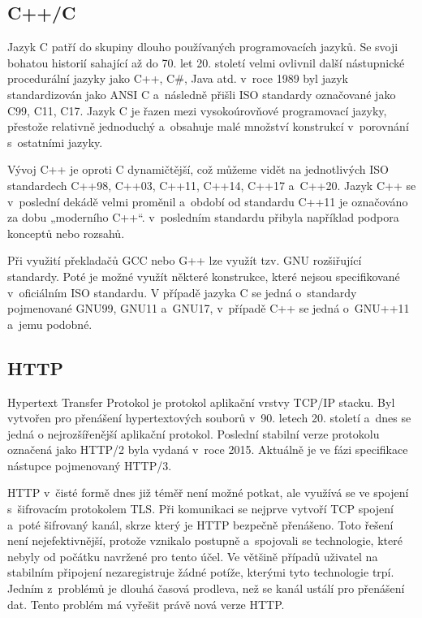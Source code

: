 \subsection{C++/C}

Jazyk C patří do skupiny dlouho používaných programovacích jazyků. Se svoji bohatou historií sahající až do 70. let 20. století velmi ovlivnil další nástupnické procedurální
jazyky jako C++, C\#, Java atd. v roce 1989 byl jazyk standardizován jako ANSI C a následně přišli ISO standardy označované jako C99, C11, C17. Jazyk C je řazen mezi
vysokoúrovňové programovací jazyky, přestože relativně jednoduchý a obsahuje malé množství konstrukcí v porovnání s ostatními jazyky.\cite{CReference}

Vývoj C++ je oproti C dynamičtější, což můžeme vidět na jednotlivých ISO standardech C++98, C++03, C++11, C++14, C++17 a C++20. Jazyk C++ se v poslední dekádě velmi
proměnil a období od standardu C++11 je označováno za dobu „moderního C++“. v posledním standardu přibyla například podpora konceptů nebo rozsahů.\cite{CPPReference}

Při využití překladačů GCC nebo G++ lze využít tzv. GNU rozšiřující standardy. Poté je možné využít některé konstrukce, které nejsou specifikované v oficiálním ISO standardu.
V případě jazyka C se jedná o standardy pojmenované GNU99, GNU11 a GNU17, v případě C++ se jedná o GNU++11 a jemu podobné.

\subsection{HTTP}

Hypertext Transfer Protokol je protokol aplikační vrstvy TCP/IP stacku. Byl vytvořen pro přenášení hypertextových souborů v 90. letech 20. století a dnes se jedná o
nejrozšířenější aplikační protokol. Poslední stabilní verze protokolu označená jako HTTP/2 byla vydaná v roce 2015. Aktuálně je ve fázi specifikace nástupce pojmenovaný HTTP/3.

HTTP v čisté formě dnes již téměř není možné potkat, ale využívá se ve spojení s šifrovacím protokolem TLS. Při komunikaci se nejprve vytvoří TCP spojení a poté šifrovaný kanál,
skrze který je HTTP bezpečně přenášeno. Toto řešení není nejefektivnější, protože vznikalo postupně a spojovali se technologie, které nebyly od počátku navržené pro tento účel.
Ve většině případů uživatel na stabilním připojení nezaregistruje žádné potíže, kterými tyto technologie trpí. Jedním z problémů je dlouhá časová prodleva, než se kanál ustálí
pro přenášení dat. Tento problém má vyřešit právě nová verze HTTP.\cite{HTTP3}

